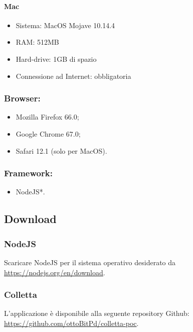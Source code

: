 \documentclass[11pt,a4paper]{article}
\begin{document}
{	\paragraph{Mac}
	\begin{itemize}
		\item Sistema: MacOS Mojave 10.14.4
		\item RAM: 512MB
		\item Hard-drive: 1GB di spazio
		\item Connessione ad Internet: obbligatoria
	\end{itemize}
	\subsubsection{Browser:}
		\begin{itemize}
		\item Mozilla Firefox 66.0;
		\item Google Chrome 67.0;
		\item Safari 12.1 (solo per MacOS).		
	\end{itemize}
	\subsubsection{Framework:}
		\begin{itemize}
		\item NodeJS*.
		\end{itemize}
	

	\subsection{Download}
	\subsubsection{NodeJS}
	Scaricare NodeJS per il sistema operativo desiderato da \url{https://nodejs.org/en/download}.
	\subsubsection{Colletta}		
	L'applicazione è disponibile alla seguente repository Github:
	\url{https://github.com/ottoBitPd/colletta-poc}.
	
}
\end{document}
